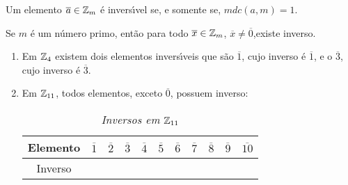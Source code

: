 \documentclass{beamer}
\begin{document}
    \begin{frame}
        \begin{proposicao}
            Um elemento $\overline{a} \in \mathbb{Z}_m$ {\'e} \pause invers{\'\i}vel \pause se, e somente se, $mdc(a,m) = 1$.\pause
        \end{proposicao}

        \begin{corolario}
            Se $m$ \'e um n\'umero primo, \pause ent\~ao para todo $\overline{x} \in \mathbb{Z}_m$, \pause $\overline{x} \ne \overline{0}$,\pause existe inverso.\pause
        \end{corolario}

        \begin{exemplos}
            \begin{enumerate}[label={\arabic*})]
                \item Em $\mathbb{Z}_4$ existem dois elementos invers{\'\i}veis \pause que s{\~a}o $\overline{1}$, \pause cujo inverso {\'e} $\overline{1}$, \pause e o $\overline{3}$, \pause cujo inverso {\'e} $\overline{3}$.\pause
                \item Em $\mathbb{Z}_{11}$, \pause todos elementos, exceto $\overline{0}$, \pause possuem inverso:\pause

                \begin{table}[h]
                    \centering 
                    \setlength{\arrayrulewidth}{0,5\arrayrulewidth}
                    \caption{\it Inversos em $\mathbb{Z}_{11}$}
                   \begin{tabular}{|c|c|c|c|c|c|c|c|c|c|c|} 
                        \hline
                        Elemento & $\overline{1}$ & $\overline{2}$ & $\overline{3}$ & $\overline{4}$ & $\overline{5}$ & $\overline{6}$ & $\overline{7}$ & $\overline{8}$ & $\overline{9}$ & $\overline{10}$\T \\
                        \hline
                        Inverso & \phantom{ab} & \phantom{ab} & \phantom{ab} & \phantom{ab} & \phantom{ab} & \phantom{ab} & \phantom{ab} & \phantom{ab} & \phantom{ab} & \phantom{ab} \T\\
                        \hline
                   \end{tabular}
                \end{table}
            \end{enumerate}
        \end{exemplos}
    \end{frame}
\end{document}

